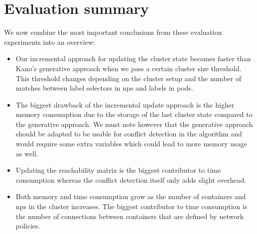 \section{Evaluation summary} \label{sec:conclusion}
We now combine the most important conclusions from these evaluation experiments into an overview:
\begin{itemize}
	\item Our incremental approach for updating the cluster state becomes faster than Kano's generative approach when we pass a certain cluster size threshold. This threshold changes depending on the cluster setup and the number of matches between label selectors in \acrshort{np}s and labels in pods. 
	\item The biggest drawback of the incremental update approach is the higher memory consumption due to the storage of the last cluster state compared to the generative approach. We must note however that the generative approach should be adapted to be usable for conflict detection in the algorithm and would require some extra variables which could lead to more memory usage as well.
	\item Updating the reachability matrix is the biggest contributor to time consumption whereas the conflict detection itself only adds slight overhead.
	\item Both memory and time consumption grow as the number of containers and \acrshort{np}s in the cluster increases. The biggest contributor to time consumption is the number of connections between containers that are defined by network policies.
\end{itemize}

\cleardoublepage
